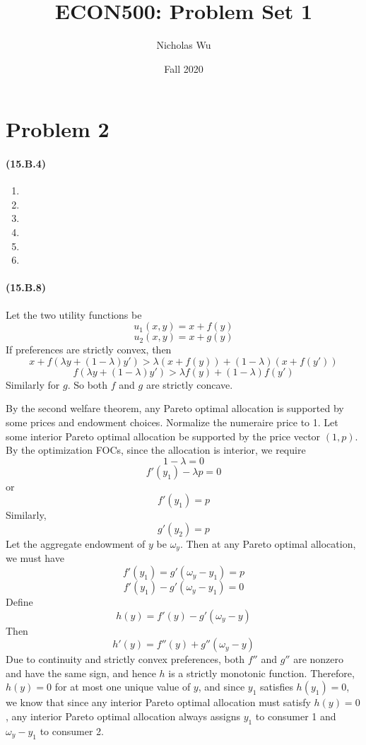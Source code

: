 \documentclass[10pt,letter]{article}
\begin{document}


\title{ECON500: Problem Set 1}

\author{Nicholas Wu}

\date{Fall 2020}

\maketitle


\section*{Problem 2}
\paragraph{(15.B.4)}
\begin{enumerate}[label=(\alph*)]
\item
\item
\item
\item
\item
\item
\end{enumerate}
\paragraph{(15.B.8)} Let the two utility functions be
\[ u_1(x,y) = x + f(y) \]
\[ u_2(x,y) = x + g(y) \]
If preferences are strictly convex, then
\[  x +  f(\lambda y + (1-\lambda)y')  > \lambda (x+f(y)) + (1-\lambda)(x + f(y')) \]
\[ f(\lambda y + (1-\lambda)y')> \lambda f(y) + (1-\lambda) f(y')  \]
Similarly for $g$. So both $f$ and $g$ are strictly concave.

By the second welfare theorem, any Pareto optimal allocation is supported by some prices and endowment choices. Normalize the numeraire price to 1. Let some interior Pareto optimal allocation be supported by the price vector $(1, p)$. By the optimization FOCs, since the allocation is interior, we require
\[ 1 - \lambda = 0 \]
\[ f'(y_1) - \lambda p =0 \]
or
\[ f'(y_1) = p \]
Similarly,
\[ g'(y_2) = p \]
Let the aggregate endowment of $y$ be $\omega_y$. Then at any Pareto optimal allocation, we must have
\[ f'(y_1) = g'(\omega_y - y_1) = p \]
\[ f'(y_1) - g'(\omega_y - y_1) = 0 \]
Define
\[ h(y) = f'(y) - g'(\omega_y - y) \]
Then
\[ h'(y) = f''(y) + g''(\omega_y - y) \]
Due to continuity and strictly convex preferences, both $f''$ and $g''$ are nonzero and have the same sign, and hence $h$ is a strictly monotonic function. Therefore, $h(y) = 0$ for at most one unique value of $y$, and since $y_1$ satisfies $h(y_1) = 0$, we know that since any interior Pareto optimal allocation must satisfy $h(y) = 0$, any interior Pareto optimal allocation always assigns $y_1$ to consumer 1 and $\omega_y - y_1$ to consumer 2.
\end{document}
